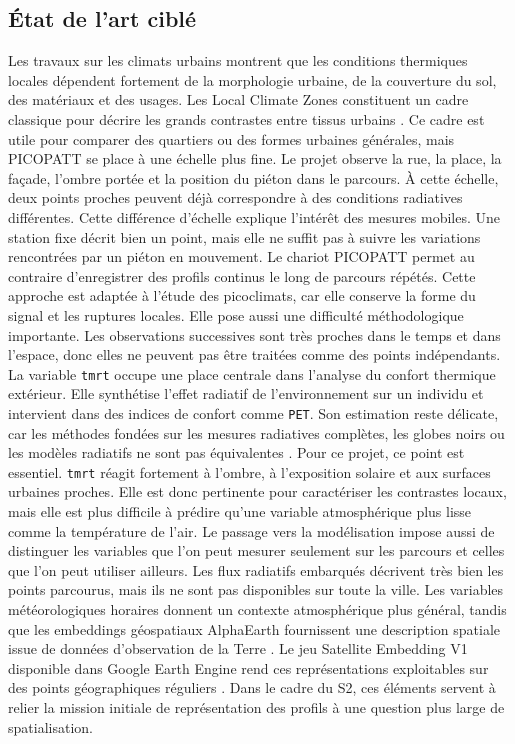 \documentclass{article}
\begin{document}
\subsection{État de l'art ciblé}

Les travaux sur les climats urbains montrent que les conditions thermiques locales dépendent fortement de la morphologie urbaine, de la couverture du sol, des matériaux et des usages. Les Local Climate Zones constituent un cadre classique pour décrire les grands contrastes entre tissus urbains \cite{stewart-oke-2012}. Ce cadre est utile pour comparer des quartiers ou des formes urbaines générales, mais PICOPATT se place à une échelle plus fine. Le projet observe la rue, la place, la façade, l'ombre portée et la position du piéton dans le parcours. À cette échelle, deux points proches peuvent déjà correspondre à des conditions radiatives différentes.
Cette différence d'échelle explique l'intérêt des mesures mobiles. Une station fixe décrit bien un point, mais elle ne suffit pas à suivre les variations rencontrées par un piéton en mouvement. Le chariot PICOPATT permet au contraire d'enregistrer des profils continus le long de parcours répétés. Cette approche est adaptée à l'étude des picoclimats, car elle conserve la forme du signal et les ruptures locales. Elle pose aussi une difficulté méthodologique importante. Les observations successives sont très proches dans le temps et dans l'espace, donc elles ne peuvent pas être traitées comme des points indépendants.
La variable \texttt{tmrt} occupe une place centrale dans l'analyse du confort thermique extérieur. Elle synthétise l'effet radiatif de l'environnement sur un individu et intervient dans des indices de confort comme \texttt{PET}. Son estimation reste délicate, car les méthodes fondées sur les mesures radiatives complètes, les globes noirs ou les modèles radiatifs ne sont pas équivalentes \cite{kruger-2014-tmrt}. Pour ce projet, ce point est essentiel. \texttt{tmrt} réagit fortement à l'ombre, à l'exposition solaire et aux surfaces urbaines proches. Elle est donc pertinente pour caractériser les contrastes locaux, mais elle est plus difficile à prédire qu'une variable atmosphérique plus lisse comme la température de l'air.
Le passage vers la modélisation impose aussi de distinguer les variables que l'on peut mesurer seulement sur les parcours et celles que l'on peut utiliser ailleurs. Les flux radiatifs embarqués décrivent très bien les points parcourus, mais ils ne sont pas disponibles sur toute la ville. Les variables météorologiques horaires donnent un contexte atmosphérique plus général, tandis que les embeddings géospatiaux AlphaEarth fournissent une description spatiale issue de données d'observation de la Terre \cite{brown-2025-alphaearth}. Le jeu Satellite Embedding V1 disponible dans Google Earth Engine rend ces représentations exploitables sur des points géographiques réguliers \cite{google-earth-engine-satellite-embedding}. Dans le cadre du S2, ces éléments servent à relier la mission initiale de représentation des profils à une question plus large de spatialisation.
\end{document}
